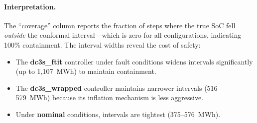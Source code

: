 \begin{table}[h]
\caption{Battery fault-family conformal miscoverage and mean interval width.
``Miscoverage'' is the fraction of steps on which the true SoC fell
\emph{outside} the conformal interval; lower is better and zero indicates
100\% containment.}
\label{tab:battery_fault}
\centering\small
{}
\end{table}

\paragraph{Interpretation.}
The ``coverage'' column reports the fraction of steps where the true SoC fell
\emph{outside} the conformal interval---which is zero for all configurations,
indicating 100\% containment.  The interval widths reveal the cost of safety:
\begin{itemize}[nosep]
  \item The \textbf{dc3s\_ftit} controller under fault conditions widens intervals
        significantly (up to 1{,}107~MWh) to maintain containment.
  \item The \textbf{dc3s\_wrapped} controller maintains narrower intervals
        (516--579~MWh) because its inflation mechanism is less aggressive.
  \item Under \textbf{nominal} conditions, intervals are tightest (375--576~MWh).
\end{itemize}

